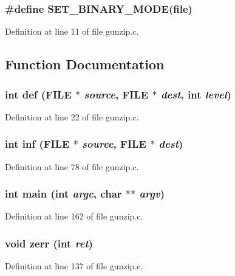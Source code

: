 \subsubsection[{SET\_\-BINARY\_\-MODE}]{\setlength{\rightskip}{0pt plus 5cm}\#define SET\_\-BINARY\_\-MODE(file)}\label{gunzip_8c_a714fe40d73494a577de3127a79ea24a2}


Definition at line 11 of file gunzip.c.



\subsection{Function Documentation}
\subsubsection[{def}]{\setlength{\rightskip}{0pt plus 5cm}int def (FILE $\ast$ {\em source}, \/  FILE $\ast$ {\em dest}, \/  int {\em level})}\label{gunzip_8c_a5b4f2d3d0d6b967b564a28fa77ab1cc4}


Definition at line 22 of file gunzip.c.

\subsubsection[{inf}]{\setlength{\rightskip}{0pt plus 5cm}int inf (FILE $\ast$ {\em source}, \/  FILE $\ast$ {\em dest})}\label{gunzip_8c_a2d4b6b347931ecd8c90017c53a7d9009}


Definition at line 78 of file gunzip.c.

\subsubsection[{main}]{\setlength{\rightskip}{0pt plus 5cm}int main (int {\em argc}, \/  char $\ast$$\ast$ {\em argv})}\label{gunzip_8c_a3c04138a5bfe5d72780bb7e82a18e627}


Definition at line 162 of file gunzip.c.

\subsubsection[{zerr}]{\setlength{\rightskip}{0pt plus 5cm}void zerr (int {\em ret})}\label{gunzip_8c_a1553a13c2c1ef70ac5cc44caaadd7d38}


Definition at line 137 of file gunzip.c.


